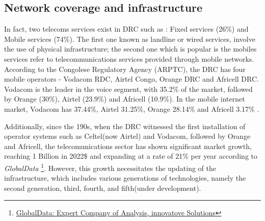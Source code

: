 \documentclass[12pt,a4paper]{report}
\begin{document}
	   \subsection{Network coverage and infrastructure}   
	    In fact, two telecoms services exist in DRC such as : Fixed services (26\%) and Mobile services (74\%). The first one known as landline or wired services, involve the use of physical infrastructure; the second one which is popular is the mobiles services refer to telecommunications services provided through mobile networks.
	    According to the Congolese Regulatory Agency (ARPTC), the DRC has four mobile operators - Vodacom RDC,
	    Airtel Congo, Orange DRC and Africell DRC. Vodacom is the leader in the voice segment, with 35.2\% of the market,
	    followed by Orange (30\%), Airtel (23.9\%) and Africell (10.9\%). In the mobile internet market, Vodacom has 37.44\%, Airtel
	    31.25\%, Orange 28.14\% and Africell 3.17\% \cite{stateInternet2019}. 
	     	        	     	        
	   Additionally, since the 190s, when the DRC witnessed the first installation of operator systems such as Celtel(now Airtel) and Vodacom, followed by Orange and Africell, the telecomunications sector has shown significant market growth, reaching 1 Billion in 2022\$ and expanding at a rate of 21\% per year according to  \textit{GlobalData} \footnote{\href{https://www.globaldata.com/store/report/drc-telecom-operators-market-analysis/}{GlobalData: Expert Company of Analysis, innovatove Solutions}}. 
	   However, this growth necessitates the updating of the infrastructure, which includes various generations of technologies, namely the second generation, third, fourth, and fifth(under development).\\
	   	   
\end{document}
